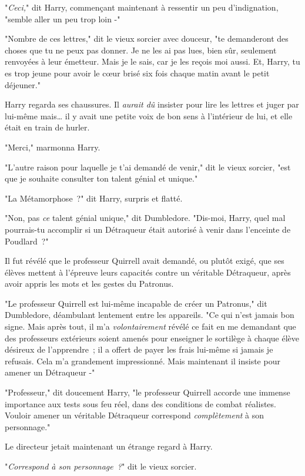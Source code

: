 "\emph{Ceci,}" dit Harry, commençant maintenant à ressentir un peu d'indignation, "semble aller un peu trop loin -"

"Nombre de ces lettres," dit le vieux sorcier avec douceur, "te demanderont des choses que tu ne peux pas donner. Je ne les ai pas lues, bien sûr, seulement renvoyées à leur émetteur. Mais je le sais, car je les reçois moi aussi. Et, Harry, tu es trop jeune pour avoir le cœur brisé six fois chaque matin avant le petit déjeuner."

Harry regarda ses chaussures. Il \emph{aurait dû} insister pour lire les lettres et juger par lui-même mais… il y avait une petite voix de bon sens à l'intérieur de lui, et elle était en train de hurler.

"Merci," marmonna Harry.

"L'autre raison pour laquelle je t'ai demandé de venir," dit le vieux sorcier, "est que je souhaite consulter ton talent génial et unique."

"La Métamorphose~?" dit Harry, surpris et flatté.

"Non, pas \emph{ce} talent génial unique," dit Dumbledore. "Dis-moi, Harry, quel mal pourrais-tu accomplir si un Détraqueur était autorisé à venir dans l'enceinte de Poudlard~?"

\later

Il fut révélé que le professeur Quirrell avait demandé, ou plutôt exigé, que ses élèves mettent à l'épreuve leurs capacités contre un véritable Détraqueur, après avoir appris les mots et les gestes du Patronus.

"Le professeur Quirrell est lui-même incapable de créer un Patronus," dit Dumbledore, déambulant lentement entre les appareils. "Ce qui n'est jamais bon signe. Mais après tout, il m'a \emph{volontairement} révélé ce fait en me demandant que des professeurs extérieurs soient amenés pour enseigner le sortilège à chaque élève désireux de l'apprendre~; il a offert de payer les frais lui-même si jamais je refusais. Cela m'a grandement impressionné. Mais maintenant il insiste pour amener un Détraqueur -"

"Professeur," dit doucement Harry, "le professeur Quirrell accorde une immense importance aux tests sous feu réel, dans des conditions de combat réalistes. Vouloir amener un véritable Détraqueur correspond \emph{complètement} à son personnage."

Le directeur jetait maintenant un étrange regard à Harry.

"\emph{Correspond à son personnage~?}" dit le vieux sorcier.

